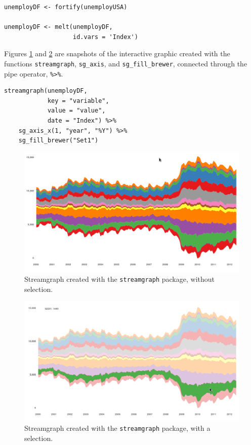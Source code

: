 \documentclass[smallroyalvopaper]{memoir}
\begin{document}
\lstset{language=r,label= ,caption= ,captionpos=b,numbers=none}
\begin{lstlisting}
unemployDF <- fortify(unemployUSA)

unemployDF <- melt(unemployDF,
                   id.vars = 'Index')
\end{lstlisting}

Figures \ref{fig:streamgraph_interactive} and
\ref{fig:streamgraph_interactive_selected} are snapshots of the
interactive graphic created with the functions \texttt{streamgraph},
\texttt{sg\_axis}, and \texttt{sg\_fill\_brewer}, connected through the pipe operator,
\texttt{\%>\%}.

\lstset{language=r,label= ,caption= ,captionpos=b,numbers=none}
\begin{lstlisting}
streamgraph(unemployDF,
            key = "variable",
            value = "value",
            date = "Index") %>%
    sg_axis_x(1, "year", "%Y") %>%
    sg_fill_brewer("Set1")
\end{lstlisting}

\begin{figure}[htbp]
\centering
\includegraphics[width=.9\linewidth]{figs/streamgraph_interactive.png}
\caption{Streamgraph created with the \texttt{streamgraph} package, without selection. \label{fig:streamgraph_interactive}}
\end{figure}

\begin{figure}[htbp]
\centering
\includegraphics[width=.9\linewidth]{figs/streamgraph_interactive_selected.png}
\caption{Streamgraph created with the \texttt{streamgraph} package, with a selection. \label{fig:streamgraph_interactive_selected}}
\end{figure}
\end{document}
